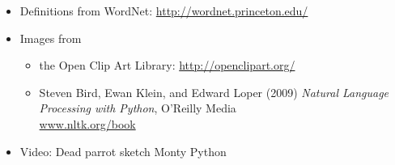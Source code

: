 \documentclass[headrule,footrule]{foils}
\begin{document}

\begin{itemize}
\item Definitions from WordNet: \url{http://wordnet.princeton.edu/}
\item Images from
  \begin{itemize}
  \item the Open Clip Art Library: \url{http://openclipart.org/}
  \item Steven Bird, Ewan Klein, and Edward Loper (2009) 
     \textit{Natural Language Processing with Python}, O'Reilly Media
    \\ \url{www.nltk.org/book}
\end{itemize}
\item Video: Dead parrot sketch Monty Python
\end{itemize}

\small



\clearpage
\end{document}
